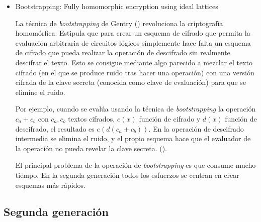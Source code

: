 \begin{itemize}

    \item Bootstrapping: Fully homomorphic encryption using ideal lattices

    La técnica de \textit{bootstrapping} de Gentry (\cite{gentry_fully_2009}) revoluciona la criptografía homomórfica. Estipula que para crear un esquema de cifrado que permita la evaluación arbitraria de circuitos lógicos símplemente hace falta un esquema de cifrado que pueda realizar la operación de descifrado sin realmente descifrar el texto. Esto se consigue mediante algo parecido a mezclar el texto cifrado (en el que se produce ruido tras hacer una operación) con una versión cifrada de la clave secreta (conocida como clave de evaluación) para que se elimine el ruido.

    Por ejemplo, cuando se evalúa usando la técnica de \textit{bootstrapping} la operación $ c_a + c_b$ con $c_a, c_b$ textos cifrados, $e(x)$ función de cifrado y  $d(x)$ función de descifrado, el resultado es $e(d(c_a + c_b) )$. En la operación de descifrado intermedia se elimina el ruido, y el propio esquema hace que el evaluador de la operación no pueda revelar la clave secreta. (\cite{noauthor_homomorphic_nodate-2}).

    El principal problema de la operación de \textit{bootstrapping} es que consume mucho tiempo. En la segunda generación todos los esfuerzos se centran en crear esquemas más rápidos.

\end{itemize}

\subsection{Segunda generación}

